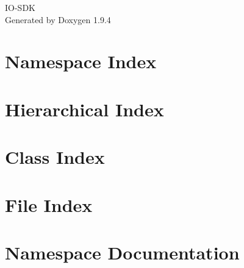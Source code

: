 \documentclass[twoside]{book}
\newcommand{\+}{\discretionary{\mbox{\scriptsize$\hookleftarrow$}}{}{}}
\newcommand{\clearemptydoublepage}{%
    \newpage{\pagestyle{empty}\cleardoublepage}%
  }
\begin{document}
  \raggedbottom
    \hypersetup{pageanchor=false,
                bookmarksnumbered=true,
                pdfencoding=unicode
               }
  \begin{titlepage}
  \vspace*{7cm}
  \begin{center}%
  {\Large IO-\/\+SDK}\\
  \vspace*{1cm}
  {\large Generated by Doxygen 1.9.4}\\
  \end{center}
  \end{titlepage}
  \clearemptydoublepage
  \tableofcontents
  \clearemptydoublepage
  \hypersetup{pageanchor=true}
\chapter{Namespace Index}

\chapter{Hierarchical Index}

\chapter{Class Index}

\chapter{File Index}

\chapter{Namespace Documentation}

























\end{document}

